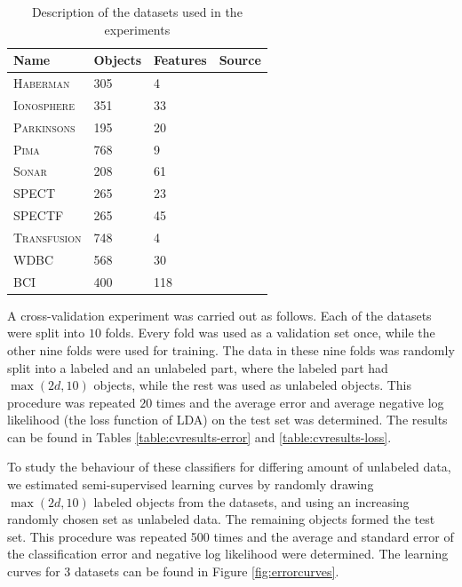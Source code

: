 \documentclass[twoside]{memoir}\usepackage[]{graphicx}\usepackage{xcolor}
\renewcommand{\cite}{\citep}
\begin{document}
\begin{table}[!t]
\caption{Description of the datasets used in the experiments}
\label{table:datasets}
\centering
\begin{tabular}{llll}
  \toprule
 Name & Objects & Features & Source \\ 
  \midrule
  \textsc{Haberman} & 305 &   4 & \cite{Lichman2013} \\ 
  \textsc{Ionosphere} & 351 &  33 & \cite{Lichman2013} \\ 
  \textsc{Parkinsons} & 195 &  20 & \cite{Lichman2013} \\ 
  \textsc{Pima} & 768 &   9 & \cite{Lichman2013} \\ 
  \textsc{Sonar} & 208 &  61 & \cite{Lichman2013} \\ 
  \textsc{SPECT} & 265 &  23 & \cite{Lichman2013} \\ 
  \textsc{SPECTF} & 265 &  45 & \cite{Lichman2013} \\ 
  \textsc{Transfusion} & 748 &   4 & \cite{Lichman2013} \\ 
  \textsc{WDBC} & 568 &  30 & \cite{Lichman2013} \\
  \textsc{BCI} & 400 & 118 & \cite{Chapelle2006} \\ 
   \bottomrule
\end{tabular}
\end{table}

A cross-validation experiment was carried out as follows. Each of the datasets were split into $10$ folds. Every fold was used as a validation set once, while the other nine folds were used for training. The data in these nine folds was randomly split into a labeled and an unlabeled part, where the labeled part had $\max(2d,10)$ objects, while the rest was used as unlabeled objects. This procedure was repeated $20$ times and the average error and average negative log likelihood (the loss function of LDA) on the test set was determined. The results can be found in Tables \ref{table:cvresults-error} and \ref{table:cvresults-loss}.

To study the behaviour of these classifiers for differing amount of unlabeled data, we estimated semi-supervised learning curves by randomly drawing $\max(2d,10)$ labeled objects from the datasets, and using an increasing randomly chosen set as unlabeled data. The remaining objects formed the test set. This procedure was repeated 500 times and the average and standard error of the classification error and negative log likelihood were determined. The learning curves for 3 datasets can be found in Figure \ref{fig:errorcurves}.
\end{document}
